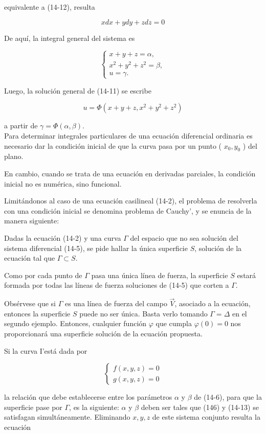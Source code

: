 \documentclass[10pt]{article}
\theoremstyle{plain}
\theoremstyle{definition}
\theoremstyle{remark}
\begin{document}
equivalente a (14-12), resulta

$$
x d x+y d y+z d z=0
$$

De aquí, la integral general del sistema es

$$
\left\{\begin{array}{l}
x+y+z=\alpha, \\
x^{2}+y^{2}+z^{2}=\beta, \\
u=\gamma .
\end{array}\right.
$$

Luego, la solución general de (14-11) se escribe

$$
u=\Phi\left(x+y+z, x^{2}+y^{2}+z^{2}\right)
$$

a partir de $\gamma=\Phi(\alpha, \beta)$.\\
Para determinar integrales particulares de una ecuación diferencial ordinaria es necesario dar la condición inicial de que la curva pasa por un punto ( $x_{0}, y_{0}$ ) del plano.

En cambio, cuando se trata de una ecuación en derivadas parciales, la condición inicial no es numérica, sino funcional.

Limitándonos al caso de una ecuación casilineal (14-2), el problema de resolverla con una condición inicial se denomina problema de Cauchy', y se enuncia de la manera siguiente:

Dadas la ecuación (14-2) y una curva $\Gamma$ del espacio que no sea solución del sistema diferencial (14-5), se pide hallar la única superficie $S$, solución de la ecuación tal que $\Gamma \subset S$.

Como por cada punto de $\Gamma$ pasa una única línea de fuerza, la superficie $S$ estará formada por todas las líneas de fuerza soluciones de (14-5) que corten a $\Gamma$.

Obsérvese que si $\Gamma$ es una línea de fuerza del campo $\vec{V}$, asociado a la ecuación, entonces la superficie $S$ puede no ser única. Basta verlo tomando $\Gamma=\Delta$ en el segundo ejemplo. Entonces, cualquier función $\varphi$ que cumpla $\varphi(0)=0$ nos proporcionará una superficie solución de la ecuación propuesta.

Si la curva I'está dada por

\[
\left\{\begin{array}{l}
f(x, y, z)=0  \tag{14-13}\\
g(x, y, z)=0
\end{array}\right.
\]

la relación que debe establecerse entre los parámetros $\alpha$ y $\beta$ de (14-6), para que la superficie pase por $\Gamma$, es la siguiente: $\alpha$ y $\beta$ deben ser tales que (146) y (14-13) se satisfagan simultáneamente. Eliminando $x, y, z$ de este sistema conjunto resulta la ecuación
\end{document}
